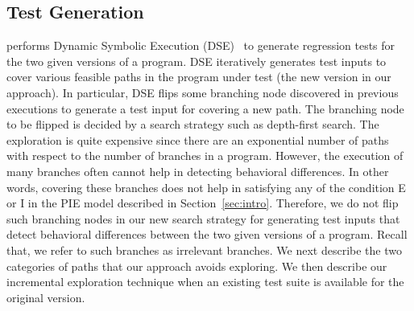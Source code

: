 \subsection{Test Generation}
 performs Dynamic Symbolic Execution (DSE)~\cite{Clarke:symbolic,king:symex,dart,cute,exe} to 
generate regression tests for the two given versions of a program. DSE iteratively generates test inputs to cover various feasible paths in the program under test (the new version in our approach). In particular, DSE flips some branching node discovered in previous executions to generate a test input for covering a new path. The branching node to be flipped is decided by a search strategy such as depth-first search. 
The exploration is quite expensive since there are an exponential 
number of paths with respect to the number of branches in a program.
 However, the execution of many branches often cannot help in detecting behavioral differences. 
 In other words, covering these branches does not help in satisfying any of the condition E or I in the PIE model described in Section~\ref{sec:intro}. 
 Therefore, we do not flip such branching nodes in our new search strategy for generating test inputs that detect 
 behavioral differences between the two given versions of a program. Recall that, we refer to such branches as irrelevant branches. We next describe the two categories of paths that our approach avoids exploring. We then describe our incremental exploration technique when an existing test suite is available for the original version.
 

